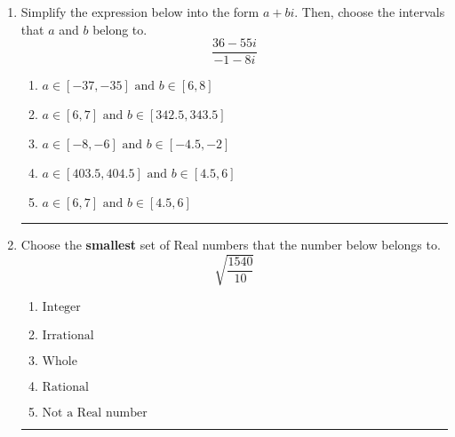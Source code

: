 \documentclass[14pt]{extbook}
\newcommand{\litem}[1]{\item#1\hspace*{-1cm}\rule{\textwidth}{0.4pt}}
\begin{document}
\begin{enumerate}
{\begin{enumerate}[label=\Alph*.]
\end{enumerate} }
\litem{
Simplify the expression below into the form $a+bi$. Then, choose the intervals that $a$ and $b$ belong to.\[ \frac{36 - 55 i}{-1 - 8 i} \]\begin{enumerate}[label=\Alph*.]
\item \( a \in [-37, -35] \text{ and } b \in [6, 8] \)
\item \( a \in [6, 7] \text{ and } b \in [342.5, 343.5] \)
\item \( a \in [-8, -6] \text{ and } b \in [-4.5, -2] \)
\item \( a \in [403.5, 404.5] \text{ and } b \in [4.5, 6] \)
\item \( a \in [6, 7] \text{ and } b \in [4.5, 6] \)

\end{enumerate} }
\litem{
Choose the \textbf{smallest} set of Real numbers that the number below belongs to.\[ \sqrt{\frac{1540}{10}} \]\begin{enumerate}[label=\Alph*.]
\item \( \text{Integer} \)
\item \( \text{Irrational} \)
\item \( \text{Whole} \)
\item \( \text{Rational} \)
\item \( \text{Not a Real number} \)

\end{enumerate} }
\end{enumerate}
\end{document}
